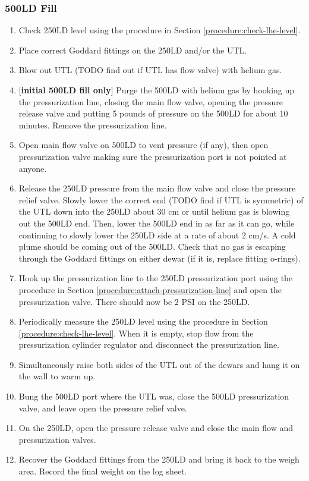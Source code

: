 \subsubsection{500LD Fill}
\label{practical-op:500LDfill}
\begin{enumerate}
 \item Check 250LD level using the procedure in Section \ref{procedure:check-lhe-level}.
 \item Place correct Goddard fittings on the 250LD and/or the UTL.
 \item Blow out UTL (TODO find out if UTL has flow valve) with helium gas.
 \item $[$\textbf{initial 500LD fill only}$]$ Purge the 500LD with helium gas by hooking up the pressurization line, closing the main flow valve, opening the pressure release valve and putting 5 pounds of pressure on the 500LD for about 10 minutes.  Remove the pressurization line.%
 \item Open main flow valve on 500LD to vent pressure (if any), then open pressurization valve making sure the pressurization port is not pointed at anyone.
 \item Release the 250LD pressure from the main flow valve and close the pressure relief valve.  Slowly lower the correct end (TODO find if UTL is symmetric) of the UTL down into the 250LD about 30 cm or until helium gas is blowing out the 500LD end.  Then, lower the 500LD end in as far as it can go, while continuing to slowly lower the 250LD side at a rate of about 2 cm/s.  A cold plume should be coming out of the 500LD.  Check that no gas is escaping through the Goddard fittings on either dewar (if it is, replace fitting o-rings).
 \item Hook up the pressurization line to the 250LD pressurization port using the procedure in Section \ref{procedure:attach-pressurization-line} and open the pressurization valve.  There should now be 2 PSI on the 250LD.
 \item Periodically measure the 250LD level using the procedure in Section \ref{procedure:check-lhe-level}.  When it is empty, stop flow from the pressurization cylinder regulator and disconnect the pressurization line.
 \item Simultaneously raise both sides of the UTL out of the dewars and hang it on the wall to warm up.
 \item Bung the 500LD port where the UTL was, close the 500LD pressurization valve, and leave open the pressure relief valve.
 \item On the 250LD, open the pressure release valve and close the main flow and pressurization valves.
 \item Recover the Goddard fittings from the 250LD and bring it back to the weigh area.  Record the final weight on the log sheet.
\end{enumerate}

